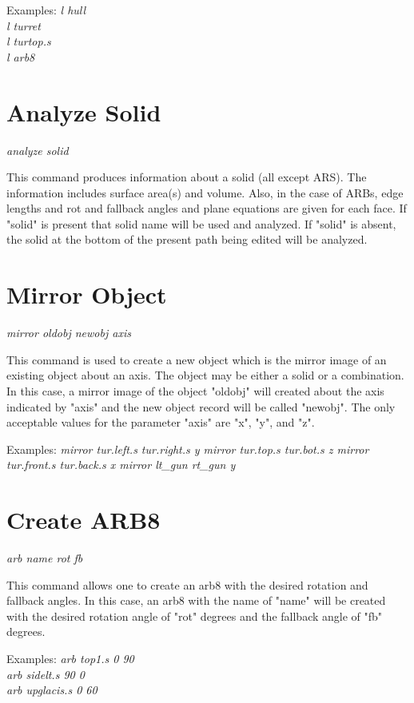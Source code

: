 Examples:
{\em
               l hull \\
               l turret \\
               l turtop.s \\
               l arb8 \\
}

\section{Analyze Solid}

{\em \center
analyze solid
}

This command produces information about a solid (all except ARS).
The information includes surface area(s) and volume.
Also, in the case of ARBs, edge lengths and rot and fallback angles
and plane equations are given for each face.
If "solid" is present that solid name will be used and analyzed.
If "solid" is absent, the solid at the bottom of the present path
being edited will be analyzed.

\section{Mirror Object}

{\em \center
mirror oldobj newobj axis
}

This command is used to create a new object which is
the mirror image of an existing object about an axis.
The object may be either a solid or a combination.
In this case, a mirror image of the object "oldobj" will created
about the axis indicated by "axis" and the new object record will
be called "newobj".
The only acceptable values for the parameter "axis" are "x", "y", and "z".

Examples:
{\em
              mirror tur.left.s tur.right.s y
              mirror tur.top.s tur.bot.s z
              mirror tur.front.s tur.back.s x
              mirror lt\_gun rt\_gun y
}

\section{Create ARB8}

{\em \center
arb name rot fb
}

This command allows one to create an arb8
with the desired rotation and fallback angles.
In this case, an arb8 with the name of "name" will be created with the desired
rotation angle of "rot" degrees and the fallback angle of "fb" degrees.

Examples:
{\em
           arb top1.s 0 90 \\
           arb sidelt.s 90 0 \\
           arb upglacis.s 0 60 \\
}

